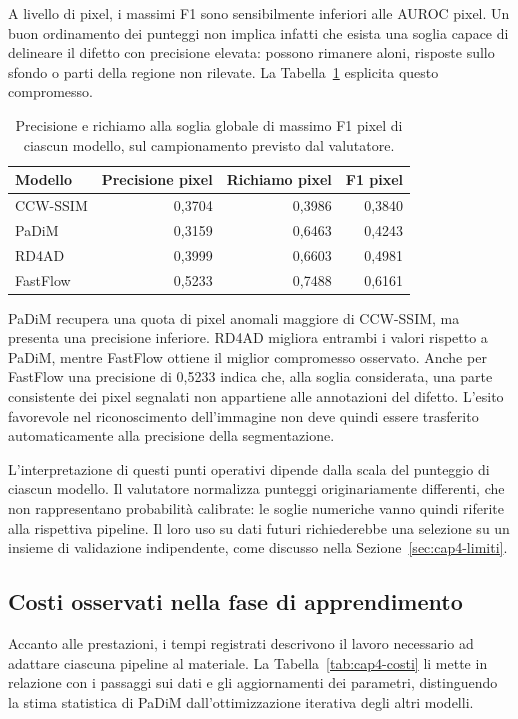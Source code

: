 A livello di pixel, i massimi F1 sono sensibilmente inferiori alle AUROC pixel. Un buon ordinamento dei punteggi non implica infatti che esista una soglia capace di delineare il difetto con precisione elevata: possono rimanere aloni, risposte sullo sfondo o parti della regione non rilevate. La Tabella~\ref{tab:cap4-precisione} esplicita questo compromesso.

\begin{table}[htbp]
\centering
\begin{tabular}{lrrr}
\hline
Modello & Precisione pixel & Richiamo pixel & F1 pixel \\
\hline
CCW-SSIM & 0,3704 & 0,3986 & 0,3840 \\
PaDiM & 0,3159 & 0,6463 & 0,4243 \\
RD4AD & 0,3999 & 0,6603 & 0,4981 \\
FastFlow & 0,5233 & 0,7488 & 0,6161 \\
\hline
\end{tabular}
\caption{Precisione e richiamo alla soglia globale di massimo F1 pixel di ciascun modello, sul campionamento previsto dal valutatore.}
\label{tab:cap4-precisione}
\end{table}

PaDiM recupera una quota di pixel anomali maggiore di CCW-SSIM, ma presenta una precisione inferiore. RD4AD migliora entrambi i valori rispetto a PaDiM, mentre FastFlow ottiene il miglior compromesso osservato. Anche per FastFlow una precisione di 0,5233 indica che, alla soglia considerata, una parte consistente dei pixel segnalati non appartiene alle annotazioni del difetto. L'esito favorevole nel riconoscimento dell'immagine non deve quindi essere trasferito automaticamente alla precisione della segmentazione.

L'interpretazione di questi punti operativi dipende dalla scala del punteggio di ciascun modello. Il valutatore normalizza punteggi originariamente differenti, che non rappresentano probabilità calibrate: le soglie numeriche vanno quindi riferite alla rispettiva pipeline. Il loro uso su dati futuri richiederebbe una selezione su un insieme di validazione indipendente, come discusso nella Sezione~\ref{sec:cap4-limiti}.

\subsection{Costi osservati nella fase di apprendimento}

Accanto alle prestazioni, i tempi registrati descrivono il lavoro necessario ad adattare ciascuna pipeline al materiale. La Tabella~\ref{tab:cap4-costi} li mette in relazione con i passaggi sui dati e gli aggiornamenti dei parametri, distinguendo la stima statistica di PaDiM dall'ottimizzazione iterativa degli altri modelli.


